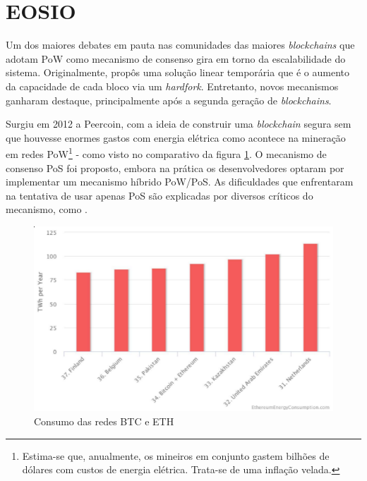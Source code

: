 \documentclass[a4paper,12pt]{monografia}
\theoremstyle{plain}
\theoremstyle{definition}
\theoremstyle{remark}
\begin{document}
\section{EOSIO}

Um dos maiores debates em pauta nas comunidades das maiores \textit{blockchains} que adotam PoW como mecanismo de consenso gira em torno da escalabilidade do sistema.
Originalmente,  prop\^os uma solu\c{c}\~ao linear tempor\'aria que \'e o aumento da capacidade de cada bloco via um \textit{hardfork}.
Entretanto, novos mecanismos ganharam destaque, principalmente ap\'os a segunda gera\c{c}\~ao de \textit{blockchains}.

Surgiu em 2012 a Peercoin, com a ideia de construir uma \textit{blockchain} segura sem que houvesse enormes gastos com energia el\'etrica como acontece na minera\c{c}\~ao em redes PoW\footnote{Estima-se que, anualmente, os mineiros em conjunto gastem bilh\~oes de d\'olares com custos de energia el\'etrica. Trata-se de uma infla\c{c}\~{a}o velada.} - como visto no comparativo da figura \ref{fig:energy}.
O mecanismo de consenso PoS foi proposto, embora na pr\'atica os desenvolvedores optaram por implementar um mecanismo h\'ibrido PoW/PoS.
As dificuldades que enfrentaram na tentativa de usar apenas PoS s\~ao explicadas por diversos cr\'iticos do mecanismo, como .

\begin{figure}[ht]
 \begin{center}
   \includegraphics[width=120mm,scale=1.0]{./figs/energy.png}
   \caption{Consumo das redes BTC e ETH\footnotemark}
   \label{fig:energy}
 \end{center}
\end{figure}

\end{document}
